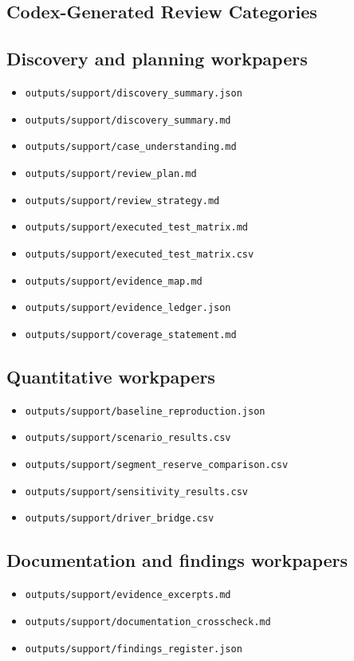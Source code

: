 \documentclass[11pt]{article}
\begin{document}
\subsection*{Codex-Generated Review Categories}
\subsection*{Discovery and planning workpapers}
\begin{itemize}
\item \texttt{outputs/support/discovery\_summary.json}
\item \texttt{outputs/support/discovery\_summary.md}
\item \texttt{outputs/support/case\_understanding.md}
\item \texttt{outputs/support/review\_plan.md}
\item \texttt{outputs/support/review\_strategy.md}
\item \texttt{outputs/support/executed\_test\_matrix.md}
\item \texttt{outputs/support/executed\_test\_matrix.csv}
\item \texttt{outputs/support/evidence\_map.md}
\item \texttt{outputs/support/evidence\_ledger.json}
\item \texttt{outputs/support/coverage\_statement.md}
\end{itemize}
\subsection*{Quantitative workpapers}
\begin{itemize}
\item \texttt{outputs/support/baseline\_reproduction.json}
\item \texttt{outputs/support/scenario\_results.csv}
\item \texttt{outputs/support/segment\_reserve\_comparison.csv}
\item \texttt{outputs/support/sensitivity\_results.csv}
\item \texttt{outputs/support/driver\_bridge.csv}
\end{itemize}
\subsection*{Documentation and findings workpapers}
\begin{itemize}
\item \texttt{outputs/support/evidence\_excerpts.md}
\item \texttt{outputs/support/documentation\_crosscheck.md}
\item \texttt{outputs/support/findings\_register.json}
\end{itemize}
\end{document}
